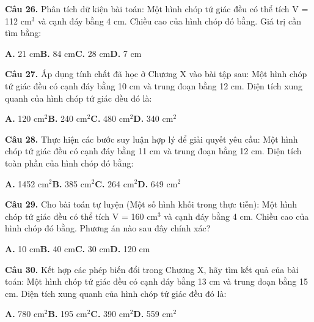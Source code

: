 \documentclass[11pt,a4paper]{article}
\begin{document}
\textbf{\color{primary} Câu 26.} Phân tích dữ kiện bài toán: Một hình chóp tứ giác đều có thể tích V = 112 cm$^3$ và cạnh đáy bằng 4 cm. Chiều cao của hình chóp đó bằng. Giá trị cần tìm bằng:\par
\hspace*{1.5em}\textbf{A.} 21 cm\quad\quad \textbf{B.} 84 cm\quad\quad \textbf{C.} 28 cm\quad\quad \textbf{D.} 7 cm\par\vspace{2pt}
\textbf{\color{primary} Câu 27.} Áp dụng tính chất đã học ở Chương X vào bài tập sau: Một hình chóp tứ giác đều có cạnh đáy bằng 10 cm và trung đoạn bằng 12 cm. Diện tích xung quanh của hình chóp tứ giác đều đó là:\par
\hspace*{1.5em}\textbf{A.} 120 cm$^2$\quad\quad \textbf{B.} 240 cm$^2$\quad\quad \textbf{C.} 480 cm$^2$\quad\quad \textbf{D.} 340 cm$^2$\par\vspace{2pt}
\textbf{\color{primary} Câu 28.} Thực hiện các bước suy luận hợp lý để giải quyết yêu cầu: Một hình chóp tứ giác đều có cạnh đáy bằng 11 cm và trung đoạn bằng 12 cm. Diện tích toàn phần của hình chóp đó bằng:\par
\hspace*{1.5em}\textbf{A.} 1452 cm$^2$\quad\quad \textbf{B.} 385 cm$^2$\quad\quad \textbf{C.} 264 cm$^2$\quad\quad \textbf{D.} 649 cm$^2$\par\vspace{2pt}
\textbf{\color{primary} Câu 29.} Cho bài toán tự luyện (Một số hình khối trong thực tiễn): Một hình chóp tứ giác đều có thể tích V = 160 cm$^3$ và cạnh đáy bằng 4 cm. Chiều cao của hình chóp đó bằng. Phương án nào sau đây chính xác?\par
\hspace*{1.5em}\textbf{A.} 10 cm\quad\quad \textbf{B.} 40 cm\quad\quad \textbf{C.} 30 cm\quad\quad \textbf{D.} 120 cm\par\vspace{2pt}
\textbf{\color{primary} Câu 30.} Kết hợp các phép biến đổi trong Chương X, hãy tìm kết quả của bài toán: Một hình chóp tứ giác đều có cạnh đáy bằng 13 cm và trung đoạn bằng 15 cm. Diện tích xung quanh của hình chóp tứ giác đều đó là:\par
\hspace*{1.5em}\textbf{A.} 780 cm$^2$\quad\quad \textbf{B.} 195 cm$^2$\quad\quad \textbf{C.} 390 cm$^2$\quad\quad \textbf{D.} 559 cm$^2$\par\vspace{2pt}
\end{document}
